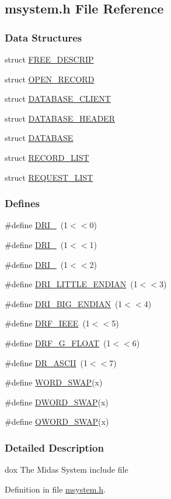 \subsection{msystem.h File Reference}
\label{msystem_8h}
\subsubsection*{Data Structures}
\begin{DoxyCompactItemize}
\item 
struct \hyperlink{structFREE__DESCRIP}{FREE\_\-DESCRIP}
\item 
struct \hyperlink{structOPEN__RECORD}{OPEN\_\-RECORD}
\item 
struct \hyperlink{structDATABASE__CLIENT}{DATABASE\_\-CLIENT}
\item 
struct \hyperlink{structDATABASE__HEADER}{DATABASE\_\-HEADER}
\item 
struct \hyperlink{structDATABASE}{DATABASE}
\item 
struct \hyperlink{structRECORD__LIST}{RECORD\_\-LIST}
\item 
struct \hyperlink{structREQUEST__LIST}{REQUEST\_\-LIST}
\end{DoxyCompactItemize}
\subsubsection*{Defines}
\begin{DoxyCompactItemize}
\item 
\#define \hyperlink{group__msdefineh_ga6f24d57769829c6f7ba50fb583a6145a}{DRI\_}~(1$<$$<$0)
\item 
\#define \hyperlink{group__msdefineh_ga23c1be975c22d964171147278528ec8a}{DRI\_}~(1$<$$<$1)
\item 
\#define \hyperlink{group__msdefineh_gab190dd0e5439f0688e15c8b5312a7e4f}{DRI\_}~(1$<$$<$2)
\item 
\#define \hyperlink{group__msdefineh_ga488afc1213500e60d6dd9a2939fb3204}{DRI\_\-LITTLE\_\-ENDIAN}~(1$<$$<$3)
\item 
\#define \hyperlink{group__msdefineh_gab3ef6d21655a8a91a2fbc6866ae42823}{DRI\_\-BIG\_\-ENDIAN}~(1$<$$<$4)
\item 
\#define \hyperlink{group__msdefineh_gacf6c5a8ba75600af57eaab22a9e6f4a5}{DRF\_\-IEEE}~(1$<$$<$5)
\item 
\#define \hyperlink{group__msdefineh_ga4ad501f5c59d4db17df10859e7ee97de}{DRF\_\-G\_\-FLOAT}~(1$<$$<$6)
\item 
\#define \hyperlink{group__msdefineh_ga0fd6c5fc5e2431d0fc11fc9ca12c6baa}{DR\_\-ASCII}~(1$<$$<$7)
\item 
\#define \hyperlink{group__msmacroh_ga4670ac841b4b8e3c3141a91a743bc61d}{WORD\_\-SWAP}(x)
\item 
\#define \hyperlink{group__msmacroh_gadb40ea04e4e009bbde68c027a8f95039}{DWORD\_\-SWAP}(x)
\item 
\#define \hyperlink{group__msmacroh_ga8c6db33e3f8af89e87556d9f7a9b32a8}{QWORD\_\-SWAP}(x)
\end{DoxyCompactItemize}


\subsubsection{Detailed Description}
dox The Midas System include file 

Definition in file \hyperlink{msystem_8h_source}{msystem.h}.